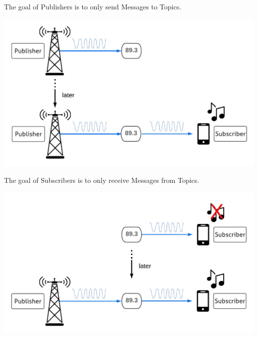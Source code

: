 \documentclass[usenames,11,dvipsnames,svgnames,x11names,aspectratio=1610,bibref]{beamer}
\newcommand{\mydisclaimer}{{\color{disclaimer}{\footnotesize Lecture 1~}}}
\renewcommand\sec{{\cnordSix{\secname}\hfill\mydisclaimer} }
\begin{document}
\begin{frame}[fragile]{\sec}
\vspace*{\fill}
\begin{center} 
The goal of Publishers is to only send Messages to Topics.

\includegraphics[width=.7\linewidth]{figures/lecture2/analogy4.pdf}

\end{center}
\vspace*{\fill}
\end{frame}


\begin{frame}[fragile]{\sec}
\vspace*{\fill}
\begin{center} 
The goal of Subscribers is to only receive Messages from Topics.

\includegraphics[width=.7\linewidth]{figures/lecture2/analogy5.pdf}

\end{center}
\vspace*{\fill}
\end{frame}
\end{document}
